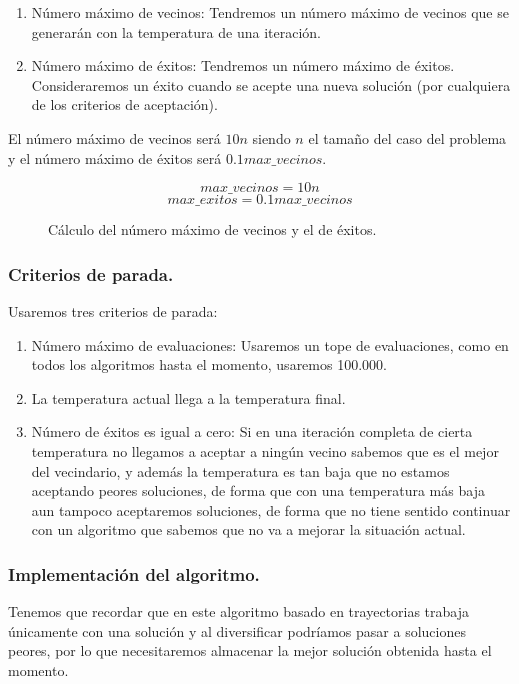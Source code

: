 \documentclass[12pt, spanish]{article}
\begin{document}
\begin{enumerate}
	\item Número máximo de vecinos: Tendremos un número máximo de vecinos que se generarán con la temperatura de una iteración.
	\item Número máximo de éxitos: Tendremos un número máximo de éxitos. Consideraremos un éxito cuando se acepte una nueva solución (por cualquiera de los criterios de aceptación).
\end{enumerate}

El número máximo de vecinos será $10 n$ siendo $n$ el tamaño del caso del problema y el número máximo de éxitos será $0.1 max\_vecinos$.

\begin{figure}[H]
	\centering
	$$ max\_vecinos = 10 n $$
	$$ max\_exitos = 0.1 max\_vecinos $$
	\caption{Cálculo del número máximo de vecinos y el de éxitos. }
	\label{cExitosVecinos}
\end{figure}


\subsubsection{Criterios de parada.}

Usaremos tres criterios de parada:

\begin{enumerate}
	\item Número máximo de evaluaciones: Usaremos un tope de evaluaciones, como en todos los algoritmos hasta el momento, usaremos 100.000.
	\item La temperatura actual llega a la temperatura final.
	\item Número de éxitos es igual a cero: Si en una iteración completa de cierta temperatura no llegamos a aceptar a ningún vecino sabemos que es el mejor del vecindario, y además la temperatura es tan baja que no estamos aceptando peores soluciones, de forma que con una temperatura más baja aun tampoco aceptaremos soluciones, de forma que no tiene sentido continuar con un algoritmo que sabemos que no va a mejorar la situación actual.
\end{enumerate}

\newpage

\subsubsection{Implementación del algoritmo.}

Tenemos que recordar que en este algoritmo basado en trayectorias trabaja únicamente con una solución y al diversificar podríamos pasar a soluciones peores, por lo que necesitaremos almacenar la mejor solución obtenida hasta el momento. 
\end{document}
